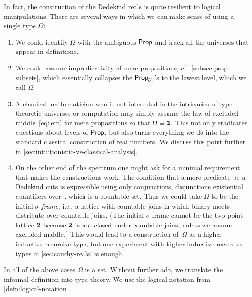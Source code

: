In fact, the construction of the Dedekind reals is quite resilient to logical
manipulations. There are several ways in which we can make sense of using a single type
$\Omega$:
%
\begin{enumerate}

\item We could identify $\Omega$ with the ambiguous $\mathsf{Prop}$ and track all the universes
  that appear in definitions.

\item We could assume impredicativity of mere propositions, cf.\
  \ref{subsec:prop-subsets}, which essentially collapses the $\mathsf{Prop}_{\mathcal{U}_i}$'s to the
  lowest level, which we call $\Omega$.

\item A classical mathematician who is not interested in the intricacies of type-theoretic
  universes or computation may simply assume the law of excluded middle~\eqref{eq:lem} for
  mere propositions so that $\Omega \equiv \mathbf{2}$. This not only eradicates questions about
  levels of $\mathsf{Prop}$, but also turns everything we do into the standard classical
  construction of real numbers. We discuss this point further in
  \autoref{sec:intuitionistic-vs-classical-analysis}.

\item On the other end of the spectrum one might ask for a minimal requirement that makes
  the constructions work. The condition that a mere predicate be a Dedekind cuts is
  expressible using only conjunctions, disjunctions existential quantifiers over~\Q, which
  is a countable set. Thus we could take $\Omega$ to be the initial \emph{$\sigma$-frame},
  i.e., a lattice with countable joins in which binary meets distribute over countable
  joins. (The initial $\sigma$-frame cannot be the two-point lattice $\mathbf{2}$ because
  $\mathbf{2}$ is not closed under countable joins, unless we assume excluded middle.) This
  would lead to a construction of~$\Omega$ as a higher inductive-recursive type, but one
  experiment with higher inductive-recursive types in \autoref{sec:cauchy-reals} is
  enough.
\end{enumerate}

In all of the above cases $\Omega$ is a set.
%
Without further ado, we translate the informal definition into type theory. We use the
logical notation from \autoref{defn:logical-notation}.

